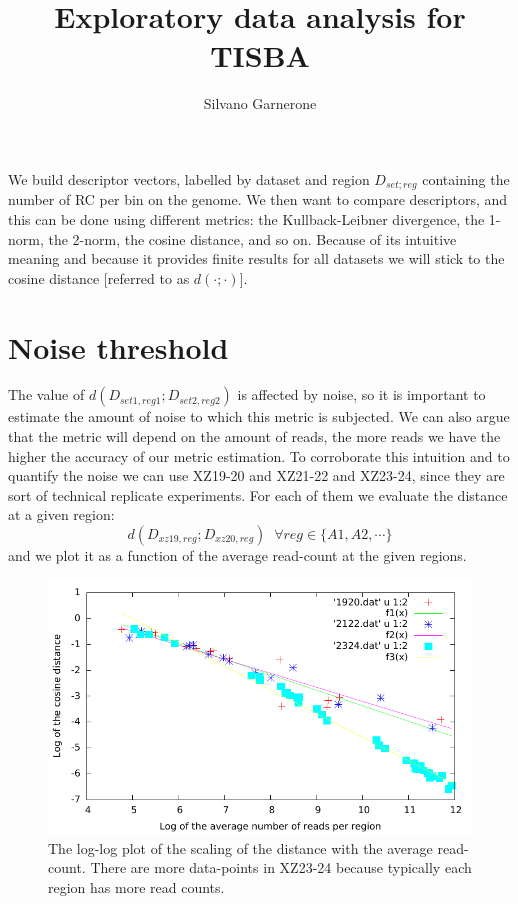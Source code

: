 \documentclass[11pt,a4paper]{article}
\author{Silvano Garnerone}
\title{Exploratory data analysis for TISBA}
\begin{document}
\maketitle
We build descriptor vectors, labelled by dataset and region $D_{set;reg}$ containing the number of RC per bin on the genome. 
We then want to compare descriptors, and this can be done using different metrics: the Kullback-Leibner divergence, the 1-norm, the 2-norm, the cosine distance, and so on. Because of its intuitive meaning and because it provides finite results for all datasets we will stick to the cosine distance [referred to as $d(\cdot;\cdot)$]. 

\section{Noise threshold}
The value of $d(D_{set1,reg1};D_{set2,reg2})$ is affected by noise, so it is important to estimate the amount of noise to which this metric is subjected. We can also argue that the metric will depend on the amount of reads, the more reads we have the higher the accuracy of our metric estimation. To corroborate this intuition and to quantify the noise we can use XZ19-20 and XZ21-22 and XZ23-24, since they are sort of technical replicate experiments. For each of them we evaluate the distance at a given region: 
$$
d(D_{xz19,reg};D_{xz20,reg}) \;\; \forall reg \in \{A1,A2,\cdots\}
$$
and we plot it as a function of the average read-count at the given regions. 

\begin{figure}[hbtp]
\centering
\includegraphics[scale=1]{distanceVSreads.pdf}
\caption{The log-log plot of the scaling of the distance with the average read-count. There are more data-points in XZ23-24 because typically each region has more read counts.}
\label{Fig:dist_count}
\end{figure}
\end{document}

